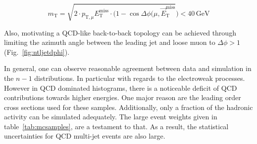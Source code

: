 \begin{equation}
  \label{eq:transverse-mass}
  m_{\text{T}} = \sqrt{2 \cdot p_{\text{T},\mu} E^{\text{miss}}_{\text{T}} \cdot ( 1 - \cos{\Delta \phi(\mu, \vec{E}^{\text{miss}}_{\text{T}}}} ) < 40\,\text{GeV}
\end{equation}

\noindent Also, motivating a QCD-like back-to-back topology can be achieved through limiting the azimuth angle between the leading jet and loose muon to $\Delta \phi > 1$ (Fig.~\ref{fig:ntljetdphi}).

In general, one can observe reasonable agreement between data and simulation in the $n - 1$ distributions. In particular with regards to the electroweak processes. However in QCD dominated histograms, there is a noticeable deficit of QCD contributions towards higher energies. One major reason are the leading order cross sections used for these samples. Additionally, only a fraction of the hadronic activity can be simulated adequately. The large event weights given in table~\ref{tab:mcsamples}, are a testament to that. As a result, the statistical uncertainties for QCD multi-jet events are also large.


